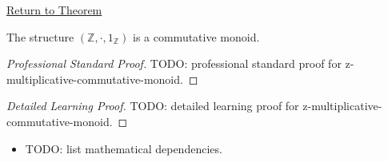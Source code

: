 \newpage
{}
\label{prf:z-multiplicative-commutative-monoid}

\begin{remark*}[Return]
\hyperref[thm:z-multiplicative-commutative-monoid]{Return to Theorem}
\end{remark*}

\begin{theorem*}
The structure $(\mathbb{Z},\cdot,1_{\mathbb{Z}})$ is a commutative monoid.
\end{theorem*}

\begin{proof}[Professional Standard Proof]
\LRAProofBodyStart
TODO: professional standard proof for z-multiplicative-commutative-monoid.
\end{proof}

\begin{proof}[Detailed Learning Proof]
\LRAProofBodyStart
TODO: detailed learning proof for z-multiplicative-commutative-monoid.
\end{proof}

\begin{remark*}
\end{remark*}

\begin{dependencies}
\begin{itemize}
  \item TODO: list mathematical dependencies.
\end{itemize}
\end{dependencies}

\clearpage
